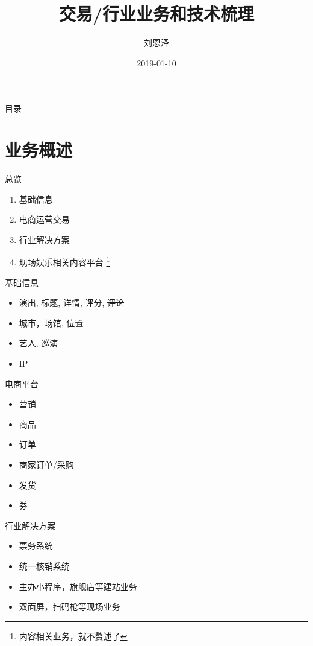 \documentclass[presentation, bigger]{beamer}
\author{刘恩泽}
\date{2019-01-10}
\title{交易/行业业务和技术梳理}
\begin{document}
\maketitle
\begin{frame}{目录}
\tableofcontents
\end{frame}


\section{业务概述}
\label{sec:org398abb7}
\begin{frame}[label={sec:orga639a5b}]{总览}
\begin{enumerate}
\item 基础信息
\item 电商运营交易
\item 行业解决方案
\item 现场娱乐相关内容平台 \footnote{内容相关业务，就不赘述了}
\end{enumerate}
\end{frame}

\begin{frame}[label={sec:orgc2a8ddc}]{基础信息}
\begin{itemize}
\item 演出, 标题, 详情, 评分, \sout{评论}
\item 城市，场馆, 位置
\item 艺人, 巡演
\item IP
\end{itemize}
\end{frame}

\begin{frame}[label={sec:org596f9a0}]{\alert{电商平台}}
\begin{itemize}
\item 营销
\item 商品
\item 订单
\item 商家订单/采购
\item 发货
\item 券
\end{itemize}
\end{frame}
\begin{frame}[label={sec:orgd109613}]{行业解决方案}
\begin{itemize}
\item 票务系统
\item 统一核销系统
\item 主办小程序，旗舰店等建站业务
\item 双面屏，扫码枪等现场业务
\end{itemize}
\end{frame}
\end{document}
